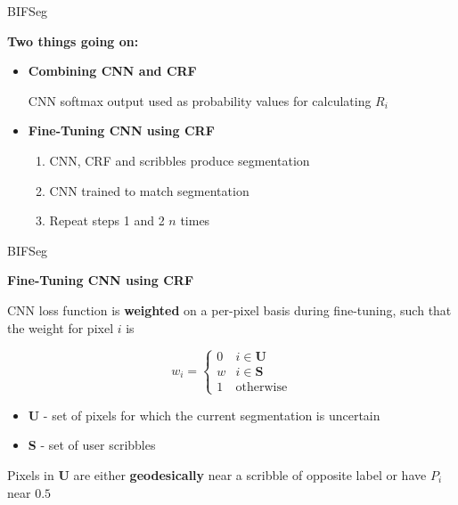 \documentclass[10pt]{beamer}
\begin{document}
\begin{frame}[fragile]{BIFSeg}

  \textbf{Two things going on:}
  \begin{itemize}
  \item {
    \textbf{Combining CNN and CRF}
  
    CNN softmax output used as probability values for calculating $R_{i}$
  }
    \pause
  \item{
  \textbf{Fine-Tuning CNN using CRF}
  \begin{enumerate}
  \item CNN, CRF and scribbles produce segmentation
  \item CNN trained to match segmentation
  \item Repeat steps 1 and 2 $n$ times
  \end{enumerate}
  }
  \end{itemize}
\end{frame}

\begin{frame}[fragile]{BIFSeg}


  \textbf{Fine-Tuning CNN using CRF}

  CNN loss function is \textbf{weighted} on a per-pixel basis during fine-tuning,
  such that the weight for pixel $i$ is

  \begin{equation} w_{i} = \begin{cases} 
      0 & i \in \mathbf{U} \\
      w & i \in \mathbf{S} \\
      1 & \textrm{otherwise}
   \end{cases}
  \end{equation}

  \begin{itemize}
  \item \textbf{U} - set of pixels for which the current segmentation is uncertain
  \item \textbf{S} - set of user scribbles
  \end{itemize}

  \pause
  Pixels in \textbf{U} are either \textbf{geodesically} near a scribble of opposite label
  or have $P_i$ near $0.5$
  
\end{frame}
\end{document}
